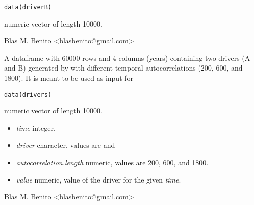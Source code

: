 \documentclass[letterpaper]{book}
\begin{document}
%
\begin{Usage}
\begin{verbatim}
data(driverB)
\end{verbatim}
\end{Usage}
%
\begin{Format}
numeric vector of length 10000.
\end{Format}
%
\begin{Author}\relax
Blas M. Benito  <blasbenito@gmail.com>
\end{Author}
%
\begin{SeeAlso}\relax
{}
\end{SeeAlso}
%
\begin{Description}\relax
A dataframe with 60000 rows and 4 columns (years) containing two drivers (A and B) generated by  with different temporal autocorrelations (200, 600, and 1800). It is meant to be used as input for 
\end{Description}
%
\begin{Usage}
\begin{verbatim}
data(drivers)
\end{verbatim}
\end{Usage}
%
\begin{Format}
numeric vector of length 10000.
\end{Format}
%
\begin{Details}\relax
\begin{itemize}

\item \emph{time} integer.
\item \emph{driver} character, values are  and 
\item \emph{autocorrelation.length} numeric, values are 200, 600, and 1800.
\item \emph{value} numeric, value of the driver for the given \emph{time}.

\end{itemize}

\end{Details}
%
\begin{Author}\relax
Blas M. Benito  <blasbenito@gmail.com>
\end{Author}
%
\begin{SeeAlso}\relax
{}
\end{SeeAlso}
\end{document}
